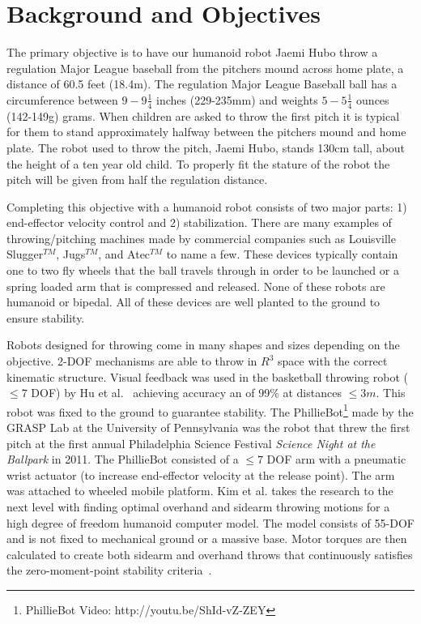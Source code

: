 \section{Background and Objectives}\label{sec:background}

The primary objective is to have our humanoid robot Jaemi Hubo throw a regulation Major League baseball from the pitchers mound across home plate, a distance of 60.5 feet (18.4m).  
The regulation Major League Baseball ball has a circumference between $9 - 9\frac{1}{4}$ inches (229-235mm) and weights $5-5\frac{1}{4}$ ounces (142-149g) grams\cite{mlbrules}.  
When children are asked to throw the first pitch it is typical for them to stand approximately halfway between the pitchers mound and home plate.
The robot used to throw the pitch, Jaemi Hubo, stands 130cm tall, about the height of a ten year old child.
To properly fit the stature of the robot the pitch will be given from half the regulation distance.





Completing this objective with a humanoid robot consists of two major parts: 1) end-effector velocity control and 2) stabilization.
There are many examples of throwing/pitching machines made by commercial companies such as Louisville Slugger$^{TM}$, Jugs$^{TM}$, and Atec$^{TM}$ to name a few.  
These devices typically contain one to two fly wheels that the ball travels through in order to be launched or a spring loaded arm that is compressed and released.
None of these robots are humanoid or bipedal.
All of these devices are well planted to the ground to ensure stability.

Robots designed for throwing come in many shapes and sizes depending on the objective.  
2-DOF mechanisms are able to throw in $R^3$ space with the correct kinematic structure.  
Visual feedback was used in the basketball throwing robot ($\leq 7$ DOF) by Hu et al.~\cite{5649335} achieving accuracy an of 99\% at distances $\leq 3m$.  This robot was fixed to the ground to guarantee stability.
The PhillieBot\footnote{PhillieBot Video: http://youtu.be/ShId-vZ-ZEY} made by the GRASP Lab at the University of Pennsylvania was the robot that threw the first pitch at the first annual Philadelphia Science Festival \textit{Science Night at the Ballpark} in 2011.  The PhillieBot consisted of a $\leq 7$ DOF arm with a pneumatic wrist actuator (to increase end-effector velocity at the release point).  The arm was attached to wheeled mobile platform.
Kim et al. \cite{5686315,JooH2011438} takes the research to the next level with finding optimal overhand and sidearm throwing motions for a high degree of freedom humanoid computer model.  The model consists of 55-DOF and is not fixed to mechanical ground or a massive base.  Motor torques are then calculated to create both sidearm and overhand throws that continuously satisfies the zero-moment-point stability criteria~\cite{4309277}.  

